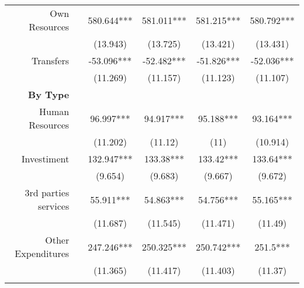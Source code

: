 \begin{table}[h!]
\begin{footnotesize}
\begin{center}
{\begin{threeparttable}[b]
\begin{tabular}{rrrrrr}
    \multicolumn{1}{p{23.285em}}{Own Resources} &       & \multicolumn{1}{c}{580.644***} & \multicolumn{1}{c}{581.011***} & \multicolumn{1}{c}{581.215***} & \multicolumn{1}{c}{580.792***} \\
          &       & \multicolumn{1}{c}{(13.943)} & \multicolumn{1}{c}{(13.725)} & \multicolumn{1}{c}{(13.421)} & \multicolumn{1}{c}{(13.431)} \\
    \multicolumn{1}{p{23.285em}}{Transfers} &       & \multicolumn{1}{c}{-53.096***} & \multicolumn{1}{c}{-52.482***} & \multicolumn{1}{c}{-51.826***} & \multicolumn{1}{c}{-52.036***} \\
          &       & \multicolumn{1}{c}{(11.269)} & \multicolumn{1}{c}{(11.157)} & \multicolumn{1}{c}{(11.123)} & \multicolumn{1}{c}{(11.107)} \\
    \multicolumn{1}{p{23.285em}}{\textbf{By Type}} &       &       &       &       &  \\
    \multicolumn{1}{p{23.285em}}{Human Resources} &       & \multicolumn{1}{c}{96.997***} & \multicolumn{1}{c}{94.917***} & \multicolumn{1}{c}{95.188***} & \multicolumn{1}{c}{93.164***} \\
          &       & \multicolumn{1}{c}{(11.202)} & \multicolumn{1}{c}{(11.12)} & \multicolumn{1}{c}{(11)} & \multicolumn{1}{c}{(10.914)} \\
    \multicolumn{1}{p{23.285em}}{Investiment} &       & \multicolumn{1}{c}{132.947***} & \multicolumn{1}{c}{133.38***} & \multicolumn{1}{c}{133.42***} & \multicolumn{1}{c}{133.64***} \\
          &       & \multicolumn{1}{c}{(9.654)} & \multicolumn{1}{c}{(9.683)} & \multicolumn{1}{c}{(9.667)} & \multicolumn{1}{c}{(9.672)} \\
    \multicolumn{1}{p{23.285em}}{3rd parties services} &       & \multicolumn{1}{c}{55.911***} & \multicolumn{1}{c}{54.863***} & \multicolumn{1}{c}{54.756***} & \multicolumn{1}{c}{55.165***} \\
          &       & \multicolumn{1}{c}{(11.687)} & \multicolumn{1}{c}{(11.545)} & \multicolumn{1}{c}{(11.471)} & \multicolumn{1}{c}{(11.49)} \\
    \multicolumn{1}{p{23.285em}}{Other Expenditures} &       & \multicolumn{1}{c}{247.246***} & \multicolumn{1}{c}{250.325***} & \multicolumn{1}{c}{250.742***} & \multicolumn{1}{c}{251.5***} \\
          &       & \multicolumn{1}{c}{(11.365)} & \multicolumn{1}{c}{(11.417)} & \multicolumn{1}{c}{(11.403)} & \multicolumn{1}{c}{(11.37)} \\
          &       &       &       &       &  \\
    \bottomrule
    \bottomrule
    \end{tabular}%
    

\end{threeparttable}}
\end{center}
\end{footnotesize}
\end{table}
